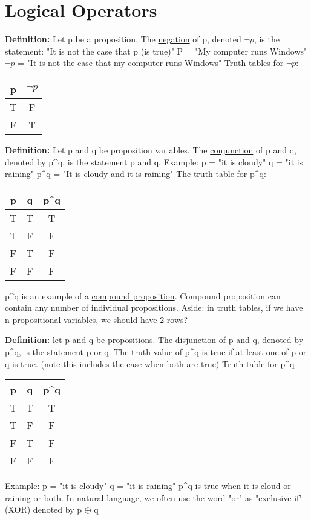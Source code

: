 \documentclass{article}
\begin{document}
\section{Logical Operators}
\textbf{Definition:} Let p be a proposition.
\hfill \break
The \underline{negation} of p, denoted \underline{$\neg p$}, is the statement:
\hfill \break
"It is not the case that p (is true)"
\hfill \break
P = "My computer runs Windows"
$\neg p$ = "It is not the case that my computer runs Windows"
\hfill \break
Truth tables for $\neg p$:
\begin{center}
\begin{tabular}{ |c|c| } 
 \hline
 p & $\neg p$  \\ 
 \hline
 T & F  \\ 
 F & T  \\ 
 \hline
\end{tabular}
\end{center}
\textbf{Definition:} Let p and q be proposition variables. The \underline{conjunction} of p and q, denoted by p\textasciicircum q, is the statement p and q.
\hfill \break
Example:
\hfill \break
p = "it is cloudy"
\hfill \break
q = "it is raining"
\hfill \break
p\textasciicircum q = "It is cloudy and it is raining"
\hfill \break
The truth table for p\textasciicircum q:
\begin{center}
\begin{tabular}{ |c|c|c| } 
 \hline
 p & q & p\textasciicircum q \\ 
 \hline
 T & T & T \\ 
 T & F & F \\
 F & T & F \\
 F & F & F \\
 \hline
\end{tabular}
\end{center}
p\textasciicircum q is an example of a \underline{compound proposition}. Compound proposition can contain any number of individual propositions.
\hfill \break
Aside: in truth tables, if we have n propositional variables, we should have 2 rows?

\hfill \break
\textbf{Definition:} let p and q be propositions. The disjunction of p and q, denoted by p\textasciicircum q, is the statement p or q. The truth value of p\textasciicircum q is true if at least one of p or q is true. (note this includes the case when both are true)
\hfill \break
Truth table for p\textasciicircum q
\begin{center}
\begin{tabular}{ |c|c|c| } 
 \hline
 p & q & p\textasciicircum q \\ 
 \hline
 T & T & T \\ 
 T & F & F \\
 F & T & F \\
 F & F & F \\
 \hline
\end{tabular}
\end{center}
Example: 
\hfill \break
p = "it is cloudy"
\hfill \break
q = "it is raining"
\hfill \break
p\textasciicircum q is true when it is cloud or raining or both.
\hfill \break
In natural language, we often use the word "or" as "exclusive if" (XOR) denoted by p $\oplus$ q
\end{document}
